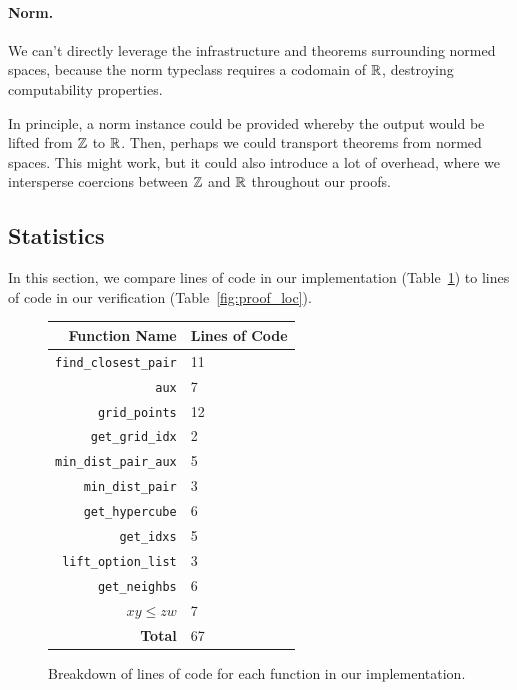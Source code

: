 \documentclass{article}
\begin{document}
\paragraph{Norm.}
We can't directly leverage the infrastructure and theorems surrounding normed spaces, because the norm typeclass requires a codomain of $\mathbb{R}$, destroying computability properties.

In principle, a norm instance could be provided whereby the output would be lifted from $\mathbb{Z}$ to $\mathbb{R}$.
Then, perhaps we could transport theorems from normed spaces.
This might work, but it could also introduce a lot of overhead, where we intersperse coercions between $\mathbb{Z}$ and $\mathbb{R}$ throughout our proofs.


\subsection{Statistics}
In this section, we compare lines of code in our implementation (Table~\ref{fig:impl_loc}) to lines of code in our verification (Table~\ref{fig:proof_loc}).

\begin{figure}[H]
\begin{center}
\begin{tabular} {|| r | l ||}
  \hline
  Function Name & Lines of Code \\
  \hline
  \hline
  \texttt{find\_closest\_pair} & 11 \\
  \hline
  \texttt{aux} & 7 \\
  \hline
  \texttt{grid\_points} & 12 \\
  \hline
  \texttt{get\_grid\_idx} & 2 \\
  \hline
  \texttt{min\_dist\_pair\_aux} & 5 \\
  \hline
  \texttt{min\_dist\_pair} & 3 \\
  \hline
  \texttt{get\_hypercube} & 6 \\
  \hline
  \texttt{get\_idxs} & 5 \\
  \hline
  \texttt{lift\_option\_list} & 3 \\
  \hline
  \texttt{get\_neighbs} & 6 \\
  \hline
  $x\!y \leq z\!w$ & 7 \\
  \hline
  \hline
  \textbf{Total} & 67 \\
  \hline
\end{tabular}
\end{center}
\caption{Breakdown of lines of code for each function in our implementation.}
\label{fig:impl_loc}
\end{figure}
\end{document}
